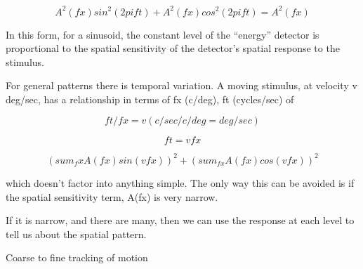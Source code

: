 \[
A^2(fx) sin^2(2pift) + A^2(fx) cos^2(2pift) = A^2(fx)
\]

In this form, for a sinusoid, the constant level of the ``energy'' detector is
proportional to the spatial sensitivity of
the detector's spatial response to the stimulus.

For general patterns there is temporal variation.
A moving stimulus, at velocity v deg/sec, has a relationship
in terms of fx (c/deg), ft (cycles/sec) of

\[
ft  / fx = v  (c/sec / c/deg = deg/sec)
\]

\[
  ft = v fx
\]

\[
(sum_fx A(fx) sin(v fx))^2 + (sum_{fx} A(fx) cos(v fx))^2
\]

which doesn't factor into anything simple.
The only way this can be avoided is if the spatial sensitivity
term, A(fx) is very narrow.

If it is narrow, and there are many,
then we can use the response at each level to
tell us about the spatial pattern.

Coarse to fine tracking of motion


